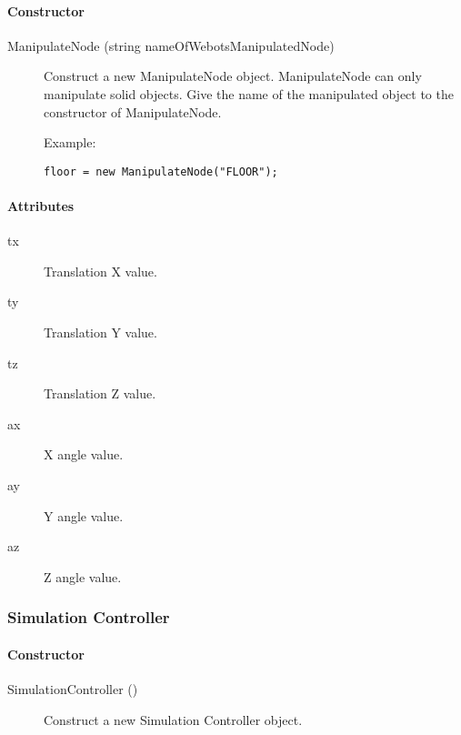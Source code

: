 \paragraph{Constructor}
\label{webots.uobjects.supervisor.manipulatenode.constructor}%

\noindent
\begin{description}
\item[{ManipulateNode (string nameOfWebotsManipulatedNode)}] Construct a new ManipulateNode object. ManipulateNode can only
          manipulate solid objects. Give the name of the manipulated object to
          the constructor of ManipulateNode.

Example:

\begin{lstlisting}
floor = new ManipulateNode("FLOOR");
\end{lstlisting}
\end{description}

\paragraph{Attributes}
\label{webots.uobjects.supervisor.manipulatenode.attributes}%

\noindent
\begin{description}
\item[{tx}] Translation X value.
\item[{ty}] Translation Y value.
\item[{tz}] Translation Z value.
\item[{ax}] X angle value.
\item[{ay}] Y angle value.
\item[{az}] Z angle value.
\end{description}

\subsubsection{Simulation Controller}
\label{webots.uobjects.supervisor.simulationcontroller}%

\paragraph{Constructor}
\label{webots.uobjects.supervisor.simulationcontroller.constructor}%

\noindent
\begin{description}
\item[{SimulationController ()}] Construct a new Simulation Controller object.

\end{description}


